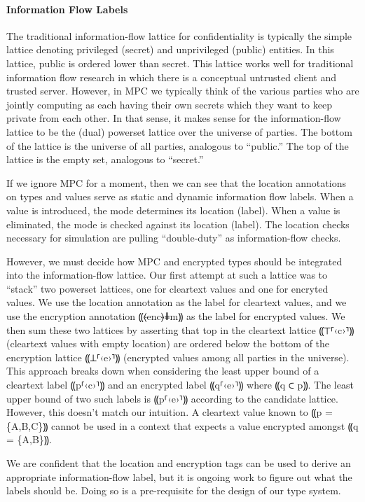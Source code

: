 \paragraph*{Information Flow Labels}

The traditional information-flow lattice for confidentiality is
typically the simple lattice denoting privileged (secret) and
unprivileged (public) entities. In this lattice, public is
ordered lower than secret. This lattice works well for traditional
information flow research in which there is a conceptual untrusted
client and trusted server. However, in MPC we typically think of
the various parties who are jointly computing as each having their
own secrets which they want to keep private from each other. In
that sense, it makes sense for the information-flow lattice to
be the (dual) powerset lattice over the universe of parties. The
bottom of the lattice is the universe of all parties, analogous
to ``public.'' The top of the lattice is the empty set, analogous
to ``secret.''

If we ignore MPC for a moment, then we can see that the location
annotations on types and values serve as static and dynamic information
flow labels. When a value is introduced, the mode determines its location (label).
When a value is eliminated, the mode is checked against its location (label).
The location checks necessary for simulation are pulling ``double-duty'' as
information-flow checks.

However, we must decide how MPC and encrypted types should be integrated into
the information-flow lattice. Our first attempt at such a lattice was to ``stack''
two powerset lattices, one for cleartext values and one for encryted values. We
use the location annotation as the label for cleartext values, and we use the
encryption annotation ⸨⦑enc⦒⋕m⸩ as the label for encrypted values. We then
sum these two lattices by asserting that top in the cleartext lattice ⸨⊤⸢‹c›⸣⸩
(cleartext values with empty location) are ordered below the bottom of the
encryption lattice ⸨⊥⸢‹e›⸣⸩ (encrypted values among all parties in the universe).
This approach breaks down when considering the least upper bound of a cleartext
label ⸨p⸢‹c›⸣⸩ and an encrypted label ⸨q⸢‹e›⸣⸩ where ⸨q ⊂ p⸩. The least upper
bound of two such labels is ⸨p⸢‹e›⸣⸩ according to the candidate lattice. However,
this doesn't match our intuition. A cleartext value known to ⸨p = \{A,B,C\}⸩ cannot
be used in a context that expects a value encrypted amongst ⸨q = \{A,B\}⸩.

We are confident that the location and encryption tags can be used to derive an appropriate
information-flow label, but it is ongoing work to figure out what the labels should be. Doing
so is a pre-requisite for the design of our type system.

